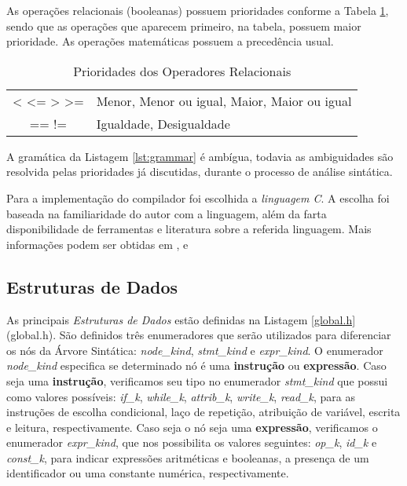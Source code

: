 As operações relacionais (booleanas) possuem prioridades conforme a Tabela
\ref{tab:prioridades}, sendo que as operações que aparecem primeiro, na
tabela, possuem maior prioridade. As operações matemáticas possuem a
precedência usual.

\begin{table}
	\begin{center}
		\begin{tabular}{c l}
			< <= > >= & Menor, Menor ou igual, Maior, Maior ou igual \\
			== !=      & Igualdade,  Desigualdade \\
		\end{tabular}
	\end{center}
	\caption{Prioridades dos Operadores Relacionais}
	\label{tab:prioridades}
\end{table}

A gramática da Listagem \ref{lst:grammar} é ambígua, todavia as ambiguidades
são resolvida pelas prioridades já discutidas, durante o processo de análise
sintática.

Para a implementação do compilador foi escolhida a \emph{linguagem C}. A
escolha foi baseada na familiaridade do autor com a linguagem, além da farta
disponibilidade de ferramentas e literatura sobre a referida linguagem. Mais
informações podem ser obtidas em ,  e

\subsection{Estruturas de Dados}
As principais \emph{Estruturas de Dados} estão definidas na Listagem
\ref{global.h} (global.h). São definidos três enumeradores que serão
utilizados para diferenciar os nós da Árvore Sintática: \emph{node\_kind},
\emph{stmt\_kind} e \emph{expr\_kind}. O enumerador \emph{node\_kind}
especifica se determinado nó é uma \textbf{instrução} ou \textbf{expressão}.
Caso seja uma \textbf{instrução}, verificamos seu tipo no enumerador
\emph{stmt\_kind} que possui como valores possíveis: \emph{if\_k},
\emph{while\_k}, \emph{attrib\_k}, \emph{write\_k}, \emph{read\_k}, para as
instruções de escolha condicional, laço de repetição, atribuição de variável,
escrita e leitura, respectivamente. Caso seja o nó seja uma
\textbf{expressão}, verificamos o enumerador \emph{expr\_kind}, que nos
possibilita os valores seguintes: \emph{op\_k}, \emph{id\_k} e
\emph{const\_k}, para indicar expressões aritméticas e booleanas, a presença
de um identificador ou uma constante numérica, respectivamente.

